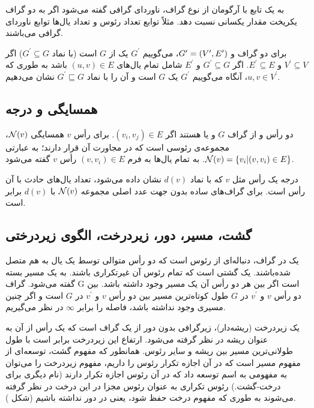 به یک تابع با آرگومان از نوع گراف، ناوردای گرافی
 گفته می‌شود اگر به دو گراف یکریخت مقدار یکسانی نسبت دهد. مثلاً توابع تعداد رئوس و تعداد یال‌ها توابع ناوردای گرافی می‌باشند.

برای دو گراف  و $G^{\prime} = (V^{\prime},E^{\prime})$، می‌گوییم $G^{\prime}$ یک  از $G$ است (با نماد $G^\prime \subseteq G$) اگر $V^\prime \subseteq V$ و $E^\prime \subseteq E$. اگر $G^\prime \subseteq G$ و $E^\prime$ شامل تمام یال‌های $(u,v) \in E$ باشد به طوری که $u,v \in V^\prime$، آنگاه می‌گوییم $G^\prime$ یک  $G$ است و آن را با نماد $G^\prime \sqsubseteq G$ نشان می‌دهیم.

\subsection{همسایگی و درجه}
دو رأس \Vi و \Vj از گراف $G$  و یا  هستند اگر $(v_i,v_j) \in E$. برای رأس $v$ همسایگی $\mathcal{N}(v)$، مجموعه‌ی رئوسی است که در مجاورت آن قرار دارند؛ به عبارتی
$\mathcal{N}(v) = \{v_i | (v,v_i) \in E\}$.
به تمام یال‌ها به فرم $(v,v_i) \in E$  رأس $v$ گفته می‌شود.

درجه یک رأس مثل $v$ که با نماد $d(v)$ نشان داده می‌شود، تعداد یال‌های حادث با آن رأس است. برای گراف‌های ساده بدون جهت عدد اصلی مجموعه $\mathcal{N}(v)$ با $d(v)$ برابر است.

\subsection{گشت، مسیر، دور، زیردرخت، الگوی زیردرختی}
یک  در گراف، دنباله‌ای از رئوس است که دو رأس متوالی توسط یک یال به هم متصل شده‌باشند. یک  گشتی است که تمام رئوس آن غیرتکراری باشند. به یک مسیر بسته  گفته می‌شود. گراف G  است اگر بین هر دو رأس آن یک مسیر وجود داشته باشد.  بین دو رأس $v$ و $v^\prime$ در $G$ طول کوتاه‌ترین مسیر بین دو رأس $v$ و $v^\prime$ در $G$ است و اگر چنین مسیری وجود نداشته باشد، فاصله را برابر $\infty$ در نظر می‌گیریم.

 
یک زیردرخت (ریشه‌دار)، زیرگرافی بدون دور از یک گراف است که یک رأس از آن به عنوان ریشه در نظر گرفته می‌شود. ارتفاع این زیردرخت برابر است با طول طولانی‌ترین مسیر بین ریشه و سایر رئوس. همانطور که مفهوم گشت، توسعه‌ای از مفهوم مسیر است که در آن اجازه تکرار رئوس را داریم، مفهوم زیردرخت را می‌توان به مفهومی به اسم  توسعه داد که در آن رئوس اجازه تکرار دارند (نام دیگری برای درخت-گشت‌.) رئوس تکراری به عنوان رئوس مجزا در این درخت در نظر گرفته می‌شوند به طوری که مفهوم درخت حفظ شود، یعنی در دور نداشته باشیم (شکل ).

